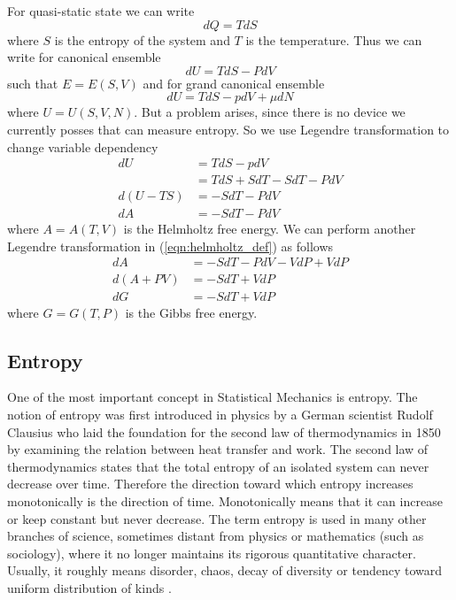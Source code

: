 	For quasi-static state we can write
	\begin{equation}
	dQ = T dS
	\label{eqn:def_enthalpy}
	\end{equation}
	where $S$ is the entropy of the system and $T$ is the temperature.
	Thus we can write for canonical ensemble
	\begin{equation}
	dU = TdS - PdV
	\label{def:internal-energy--entropy-volumn}
	\end{equation}
	such that $E=E(S,V)$  and 
	for grand canonical ensemble 
	\begin{equation}
	dU = TdS - pdV + \mu dN
	\end{equation}
	where $U=U(S,V,N)$.
	But a problem arises, since there is no device we currently posses that can measure entropy. So we use Legendre transformation to change variable dependency
	\begin{align}
		dU  	&= TdS - pdV  \nonumber \\ 
		&= TdS + SdT - SdT - PdV  \nonumber \\ 
		d(U-TS) &= -SdT - PdV  \nonumber \\
		dA 		&= -SdT - PdV \label{eqn:helmholtz_def}
	\end{align}
	where $A=A(T,V)$  is the Helmholtz free energy. We can perform another Legendre transformation in (\ref{eqn:helmholtz_def}) as follows
	\begin{align}
		dA 		&= -SdT - PdV -VdP + VdP \nonumber \\
		d(A+PV) &= -SdT + VdP \nonumber \\
		dG      &= -SdT + VdP \label{eqn:gibbs_def}
	\end{align}
	where $G=G(T,P)$ is the Gibbs free energy.
	
	
	\subsection{Entropy}
	\label{subsect:entropy-thermodynamics}
	One of the most important concept in Statistical Mechanics is entropy. The notion of entropy was first introduced in physics by a German scientist Rudolf Clausius who laid the foundation for the second law of thermodynamics in 1850 by examining the relation between heat transfer and work.
	The second law of thermodynamics states that the total entropy of an isolated system can never decrease over time. Therefore the direction toward which entropy increases monotonically is the direction of time. Monotonically means that it can increase or keep constant but never decrease.	The term entropy	is used in many other branches of science, sometimes distant from physics or mathematics (such	as sociology), where it no longer maintains its rigorous quantitative character. Usually, it roughly	means disorder, chaos, decay of diversity or tendency toward uniform distribution of kinds \cite{Downarowicz2009}.
	
